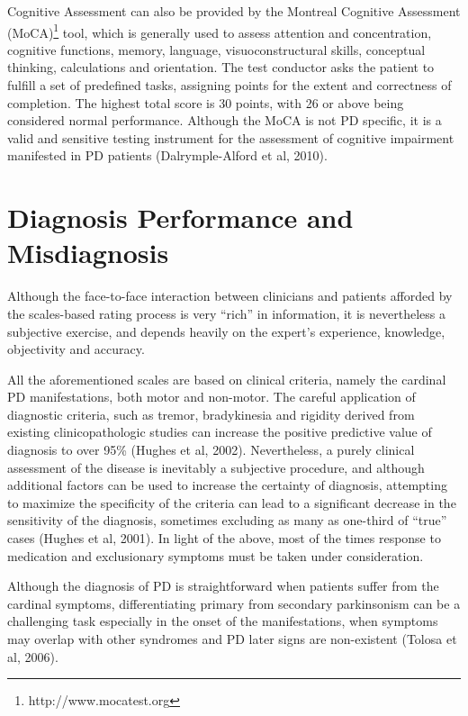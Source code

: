 Cognitive Assessment can also be provided by the Montreal Cognitive Assessment (MoCA)\footnote{http://www.mocatest.org} tool, which is generally used to assess attention and concentration, cognitive functions, memory, language, visuoconstructural skills, conceptual thinking, calculations and orientation. The test conductor asks the patient to fulfill a set of predefined tasks, assigning points for the extent and correctness of completion. The highest total score is 30 points, with 26 or above being considered normal performance. Although the MoCA is not \gls{PD} specific, it is a valid and sensitive testing instrument for the assessment of cognitive impairment manifested in \gls{PD} patients (Dalrymple-Alford et al, 2010). 


\section{Diagnosis Performance and Misdiagnosis}
\label{sec:misdiagnosis}
Although the face-to-face interaction between clinicians and patients afforded by the scales-based rating process is very ``rich'' in information, it is nevertheless a subjective exercise, and depends heavily on the expert's experience, knowledge, objectivity and accuracy.

All the aforementioned scales are based on clinical criteria, namely the cardinal \gls{PD} manifestations, both motor and non-motor. The careful application of diagnostic criteria, such as tremor, bradykinesia and rigidity derived from existing clinicopathologic studies can increase the positive predictive value of diagnosis to over 95\% (Hughes et al, 2002). Nevertheless, a purely clinical assessment of the disease is inevitably a subjective procedure, and although additional factors can be used to increase the certainty of diagnosis, attempting to maximize the specificity of the criteria can lead to a significant decrease in the sensitivity of the diagnosis, sometimes excluding as many as one-third of ``true'' cases (Hughes et al, 2001). In light of the above, most of the times response to medication and exclusionary symptoms must be taken under consideration.

Although the diagnosis of \gls{PD} is straightforward when patients suffer from the cardinal symptoms, differentiating primary from secondary parkinsonism can be a challenging task especially in the onset of the manifestations, when symptoms may overlap with other syndromes and \gls{PD} later signs are non-existent (Tolosa et al, 2006).

